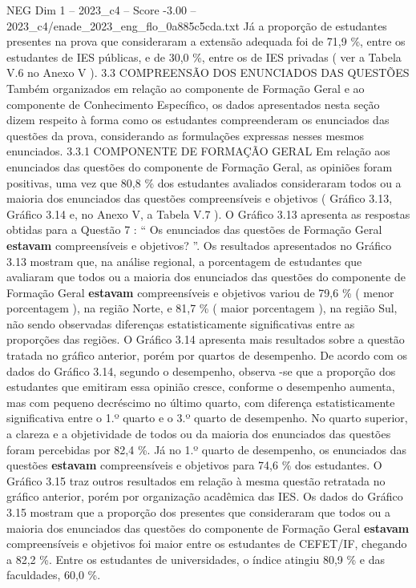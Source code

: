 \begin{textsample}{NEG Dim 1 – 2023\_c4 – Score -3.00 – 2023\_c4/enade\_2023\_eng\_flo\_0a885c5cda.txt}
Já a proporção de estudantes presentes na prova que consideraram a extensão adequada foi de 71,9 \%, entre os estudantes de IES públicas, e de 30,0 \%, entre os de IES privadas ( ver a Tabela V.6 no Anexo V ). 3.3 COMPREENSÃO DOS ENUNCIADOS DAS QUESTÕES Também organizados em relação ao componente de Formação Geral e ao componente de Conhecimento Específico, os dados apresentados nesta seção dizem respeito à forma como os estudantes compreenderam os enunciados das questões da prova, considerando as formulações expressas nesses mesmos enunciados. 3.3.1 COMPONENTE DE FORMAÇÃO GERAL Em relação aos enunciados das questões do componente de Formação Geral, as opiniões foram positivas, uma vez que 80,8 \% dos estudantes avaliados consideraram todos ou a maioria dos enunciados das questões compreensíveis e objetivos ( Gráfico 3.13, Gráfico 3.14 e, no Anexo V, a Tabela V.7 ).
O Gráfico 3.13 apresenta as respostas obtidas para a Questão 7 : “ Os enunciados das questões de Formação Geral \textbf{estavam} compreensíveis e objetivos? ”.
Os resultados apresentados no Gráfico 3.13 mostram que, na análise regional, a porcentagem de estudantes que avaliaram que todos ou a maioria dos enunciados das questões do componente de Formação Geral \textbf{estavam} compreensíveis e objetivos variou de 79,6 \% ( menor porcentagem ), na região Norte, e 81,7 \% ( maior porcentagem ), na região Sul, não sendo observadas diferenças estatisticamente significativas entre as proporções das regiões.
O Gráfico 3.14 apresenta mais resultados sobre a questão tratada no gráfico anterior, porém por quartos de desempenho.
De acordo com os dados do Gráfico 3.14, segundo o desempenho, observa -se que a proporção dos estudantes que emitiram essa opinião cresce, conforme o desempenho aumenta, mas com pequeno decréscimo no último quarto, com diferença estatisticamente significativa entre o 1.º quarto e o 3.º quarto de desempenho.
No quarto superior, a clareza e a objetividade de todos ou da maioria dos enunciados das questões foram percebidas por 82,4 \%.
Já no 1.º quarto de desempenho, os enunciados das questões \textbf{estavam} compreensíveis e objetivos para 74,6 \% dos estudantes.
O Gráfico 3.15 traz outros resultados em relação à mesma questão retratada no gráfico anterior, porém por organização acadêmica das IES.
Os dados do Gráfico 3.15 mostram que a proporção dos presentes que consideraram que todos ou a maioria dos enunciados das questões do componente de Formação Geral \textbf{estavam} compreensíveis e objetivos foi maior entre os estudantes de CEFET/IF, chegando a 82,2 \%.
Entre os estudantes de universidades, o índice atingiu 80,9 \% e das faculdades, 60,0 \%.

\end{textsample}
